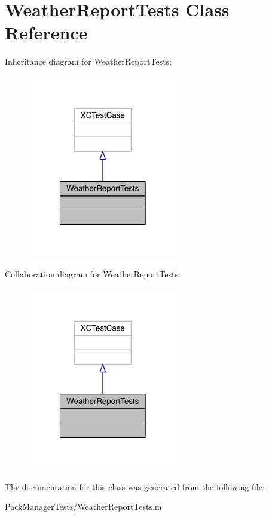\hypertarget{interface_weather_report_tests}{\section{Weather\-Report\-Tests Class Reference}
\label{interface_weather_report_tests}
}


Inheritance diagram for Weather\-Report\-Tests\-:\nopagebreak
\begin{figure}[H]
\begin{center}
\leavevmode
\includegraphics[width=186pt]{interface_weather_report_tests__inherit__graph}
\end{center}
\end{figure}


Collaboration diagram for Weather\-Report\-Tests\-:\nopagebreak
\begin{figure}[H]
\begin{center}
\leavevmode
\includegraphics[width=186pt]{interface_weather_report_tests__coll__graph}
\end{center}
\end{figure}


The documentation for this class was generated from the following file\-:\begin{DoxyCompactItemize}
\item 
Pack\-Manager\-Tests/Weather\-Report\-Tests.\-m\end{DoxyCompactItemize}
